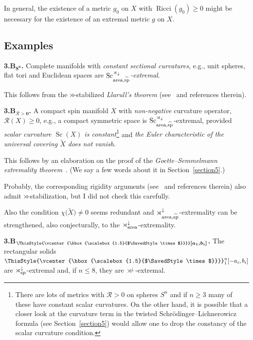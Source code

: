 \documentclass[pdftex]{sigma}
\numberwithin{equation}{section}
\newcommand\bigtimes{\mathbin{\ThisStyle{\vcenter{\hbox{%
\scalebox{1.5}{$\SavedStyle\times$}}}}}}
\begin{document}
In general, the existence of a metric $g_0$ on $X$ with $\operatorname{Ricci}(g_0)\geq 0$ might be necessary for the existence of an extremal metric $g$ on $X$.

\subsection*{Examples}

\textbf{3.B$\boldsymbol{{}_{S^n}}$.}
 Complete manifolds with {\it constant sectional curvatures}, e.g., unit spheres, flat tori and Euclidean spaces
 are {\it $\operatorname{Sc}^{\rtimes_\downarrow}_{{\rm area},\widetilde{\rm sp}}$-extremal}.

 This follows from the $\rtimes$-stabilized {\it Llarull's theorem} (see~\cite{Gr2021} and references therein).

\textbf{3.B$\boldsymbol{{}_{\mathcal R>0}}$.} A compact spin manifold $X$
 with {\it non-negative} curvature operator, $ \mathcal R(X)\geq 0$,
e.g., a compact symmetric space is $\operatorname{Sc}^{\rtimes_\downarrow}_{{\rm area},\widetilde{\rm sp}}$-extremal, provided {\it scalar curvature $\operatorname{Sc}(X)$ is constant}\footnote{There are lots of metrics with $\mathcal R>0$ on spheres $S^n$ and if $n\geq 3$ many of these have constant scalar curvatures.
On the other
 hand, it is possible that a closer look at the curvature term in the twisted Schr\"odinger--Lichnerowicz formula (see Section~\ref{section5}) would allow one to drop the constancy of the scalar curvature condition.}
 and {\it the Euler characteristic of the universal covering $\tilde X$ does not vanish}.

 This follows
 by an elaboration on the proof of the {\it Goette--Semmelmann extremality theorem}~\cite{GS2002}. (We say a few words about it in Section~\ref{section5}.)

Probably, the corresponding rigidity arguments (see~\cite{Li2010} and references therein) also
 admit $\rtimes $-stabilization, but I did not check this carefully.

Also the
 condition $\chi\bigl(\tilde X\bigr)\neq 0$ seems redundant and $\rtimes^{\downarrow}_{{\rm area},\widetilde{\rm sp}}$-extremality can be strengthened, also conjecturally, to
 the $\rtimes^{\downarrow}_{\rm area}$-extremality.

\textbf{3.B$\boldsymbol{{}_{\bigtimes [a_1,b_i]}}$.} The rectangular solids $\bigtimes_1^n[-a_i,b_i]$
 are $\rtimes^\downarrow_{\rm sp}$-extremal and, if $n\leq 8$, they are ${\rtimes^\downarrow}$-extremal.
\end{document}
